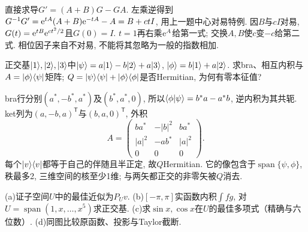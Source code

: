 \begin{solution}
直接求导$G'=(A+B)G-GA$. 左乘逆得到$G^{-1}G'=\mathrm e^{tA}(A+B)\mathrm e^{-tA}-A=B+ctI$, 用上一题中心对易特例. 因$B$与$cI$对易,$G(t)=\mathrm e^{tB}\mathrm e^{ct^2/2}$且$G(0)=I$. $t=1$再右乘$\mathrm e^A$给第一式; 交换$A,B$使$c$变$-c$给第二式. 相位因子来自不对易, 不能将其忽略为一般的指数相加.
\end{solution}
\begin{exercise}
正交基$\lvert 1\rangle,\lvert 2\rangle,\lvert 3\rangle$中$\lvert \psi\rangle=a\lvert 1\rangle-b\lvert 2\rangle+a\lvert 3\rangle$, $\lvert \phi\rangle=b\lvert 1\rangle+a\lvert 2\rangle$. 求bra、相互内积与$A=\lvert \phi\rangle\langle \psi\rvert$矩阵; $Q=\lvert \psi\rangle\langle \psi\rvert+\lvert \phi\rangle\langle \phi\rvert$是否Hermitian, 为何有零本征值?
\end{exercise}
\begin{solution}
bra行分别$(a^*,-b^*,a^*)$及$(b^*,a^*,0)$, 所以$\langle \phi\vert \psi\rangle=b^*a-a^*b$, 逆内积为其共轭. ket列为$(a,-b,a)^{\mathsf T}$与$(b,a,0)^{\mathsf T}$, 外积
\[
A=\begin{pmatrix}ba^*&-|b|^2&ba^*\\|a|^2&-ab^*&|a|^2\\0&0&0\end{pmatrix}.
\]
每个$\lvert v\rangle\langle v\rvert$都等于自己的伴随且半正定, 故$Q$Hermitian. 它的像包含于$\operatorname{span}\{\psi,\phi\}$, 秩最多2, 三维空间的核至少1维; 与两矢都正交的非零矢被$Q$消去.
\end{solution}
\begin{exercise}
(a)证子空间$U$中的最佳近似为$P_Uv$. (b)$[-\pi,\pi]$实函数内积$\int fg$, 对$U=\operatorname{span}(1,x,\ldots,x^5)$求正交基. (c)求$\sin x,\cos x$在$U$的最佳多项式（精确与六位数）. (d)同图比较原函数、投影与Taylor截断.
\end{exercise}
